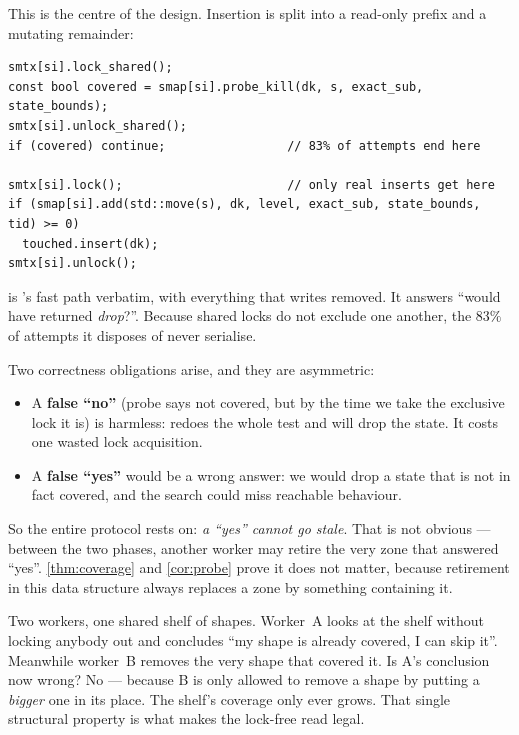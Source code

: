 \FigProtocol

This is the centre of the design.  Insertion is split into a read-only prefix
and a mutating remainder:

\begin{center}
\begin{minipage}{0.93\linewidth}
\begin{lstlisting}
smtx[si].lock_shared();
const bool covered = smap[si].probe_kill(dk, s, exact_sub, state_bounds);
smtx[si].unlock_shared();
if (covered) continue;                 // 83% of attempts end here

smtx[si].lock();                       // only real inserts get here
if (smap[si].add(std::move(s), dk, level, exact_sub, state_bounds, tid) >= 0)
  touched.insert(dk);
smtx[si].unlock();
\end{lstlisting}
\end{minipage}
\end{center}

 is 's fast path verbatim, with everything that
writes removed.  It answers ``would  have returned \emph{drop}?''.
Because shared locks do not exclude one another, the $83\%$ of attempts it
disposes of never serialise.

Two correctness obligations arise, and they are asymmetric:

\begin{itemize}[leftmargin=1.2em, itemsep=2pt]
\item A \textbf{false ``no''} (probe says not covered, but by the time we take
      the exclusive lock it is) is harmless:  redoes the whole test
      and will drop the state.  It costs one wasted lock acquisition.

\item A \textbf{false ``yes''} would be a wrong answer: we would drop a state
      that is not in fact covered, and the search could miss reachable
      behaviour.
\end{itemize}

So the entire protocol rests on: \emph{a ``yes'' cannot go stale}.  That is not
obvious --- between the two phases, another worker may retire the very zone
that answered ``yes''.  \cref{thm:coverage} and \cref{cor:probe} prove it does
not matter, because retirement in this data structure always replaces a zone
by something containing it.

\begin{intuition}
Two workers, one shared shelf of shapes.  Worker~A looks at the shelf without
locking anybody out and concludes ``my shape is already covered, I can skip
it''.  Meanwhile worker~B removes the very shape that covered it.  Is A's
conclusion now wrong?  No --- because B is only allowed to remove a shape by
putting a \emph{bigger} one in its place.  The shelf's coverage only ever
grows.  That single structural property is what makes the lock-free read legal.
\end{intuition}

